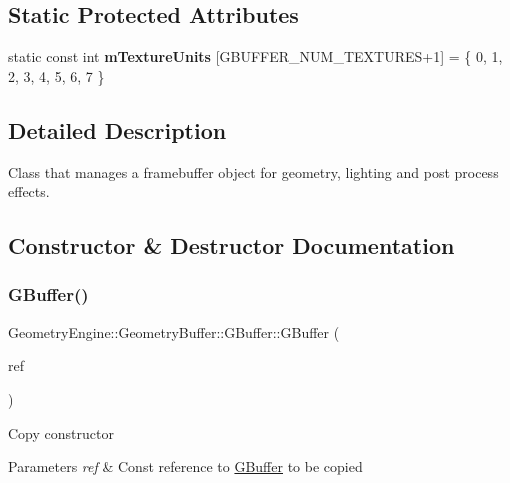 \subsection*{Static Protected Attributes}
\begin{DoxyCompactItemize}
\item 
\mbox{\label{class_geometry_engine_1_1_geometry_buffer_1_1_g_buffer_ac0644e1c1bbc64dfae4c1425c528571b}} 
static const int {\bfseries m\+Texture\+Units} \mbox{[}G\+B\+U\+F\+F\+E\+R\+\_\+\+N\+U\+M\+\_\+\+T\+E\+X\+T\+U\+R\+ES+1\mbox{]} = \{ 0, 1, 2, 3, 4, 5, 6, 7 \}
\end{DoxyCompactItemize}


\subsection{Detailed Description}
Class that manages a framebuffer object for geometry, lighting and post process effects. 

\subsection{Constructor \& Destructor Documentation}
\mbox{\label{class_geometry_engine_1_1_geometry_buffer_1_1_g_buffer_a9b44aaba6f5e1ef02cdc8ab821d560bb}} 
\subsubsection{\texorpdfstring{GBuffer()}{GBuffer()}}
{\footnotesize\ttfamily Geometry\+Engine\+::\+Geometry\+Buffer\+::\+G\+Buffer\+::\+G\+Buffer (\begin{DoxyParamCaption}\item[{const \mbox{\hyperlink{class_geometry_engine_1_1_geometry_buffer_1_1_g_buffer}{G\+Buffer}} \&}]{ref }\end{DoxyParamCaption})}

Copy constructor 
\begin{DoxyParams}{Parameters}
{\em ref} & Const reference to \mbox{\hyperlink{class_geometry_engine_1_1_geometry_buffer_1_1_g_buffer}{G\+Buffer}} to be copied \\
\hline
\end{DoxyParams}


